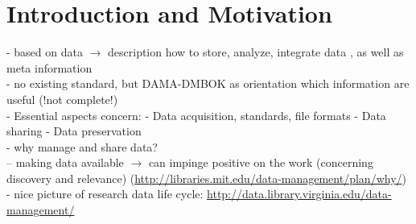 
\section{Introduction and Motivation}
- based on data $\rightarrow$ description how to store, analyze, integrate data \cite{lecture}, as well as meta information\\
- no existing standard, but DAMA-DMBOK as orientation which information are useful (!not complete!)\cite{lecture}\\
- Essential aspects concern: - Data acquisition, standards, file formats  - Data sharing - Data preservation \cite{lecture}\\
- why manage and share data?\\
-- making data available $\rightarrow$ can impinge positive on the work (concerning discovery and relevance) (\url{http://libraries.mit.edu/data-management/plan/why/})\\
- nice picture of research data life cycle: \url{http://data.library.virginia.edu/data-management/} 
